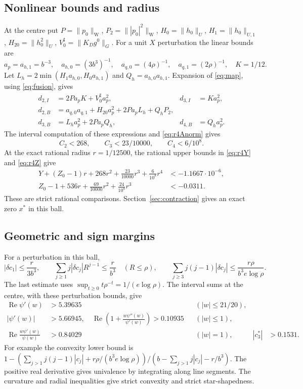 \documentclass[11pt]{amsart}
\theoremstyle{remark}
\numberwithin{equation}{section}
\newcommand{\re}{\operatorname{Re}}
\newcommand{\norm}[1]{\lVert#1\rVert}
\begin{document}
\subsection{Nonlinear bounds and radius}
At the centre put
$P=\norm{p_0}_{\mathrm W}$, $P_2=\norm{|p_0|^2}_{\mathrm W}$,
$H_0=\norm{h_0}_U$, $H_1=\norm{h_0}_{U,1}$,
$H_{20}=\norm{h_0^2}_U$, $V_0^\sharp=\norm{K_Dg^0}_G$.
For a unit $X$ perturbation the linear bounds are
\[
 a_p=a_{h,1}=b^{-3},\quad a_{h,0}=(3b^3)^{-1},\quad
 a_{q,0}=(4\rho)^{-1},\quad a_{q,1}=(2\rho)^{-1},\quad K=1/12.
\]
Let $L_h=2\min(H_1a_{h,0},H_0a_{h,1})$ and
$Q_h=a_{h,0}a_{h,1}$. Expansion of \eqref{eq:map}, using
\eqref{eq:fusion}, gives
\begin{align*}
 d_{2,I}&=2Pa_pK+V_0^\sharp a_p^2,&d_{3,I}&=Ka_p^2,\\
 d_{2,B}&=a_{q,0}a_{q,1}+H_{20}a_p^2+2Pa_pL_h+Q_hP_2,\\
 d_{3,B}&=L_ha_p^2+2Pa_pQ_h,&d_{4,B}&=Q_ha_p^2.
\end{align*}
The interval computation of these expressions and \eqref{eq:r4Anorm}
gives
\[
 C_2<268,\qquad C_3<23/10000,\qquad C_4<6/10^8.
\]
At the exact rational radius $r=1/12500$, the rational upper bounds in
\eqref{eq:r4Y} and \eqref{eq:r4Z} give
\begin{align}
 Y+(Z_0-1)r+268r^2+\frac{23}{10000}r^3+\frac6{10^8}r^4
     &<-1.1667\cdot10^{-6},\label{eq:r4poly}\\
 Z_0-1+536r+\frac{69}{10000}r^2+\frac{24}{10^8}r^3
     &<-0.0311.\label{eq:r4lip}
\end{align}
These are strict rational comparisons. Section~\ref{sec:contraction}
gives an exact zero $x^*$ in this ball.

\subsection{Geometric and sign margins}
For a perturbation in this ball,
\[
 |\delta c_1|\le\frac r{3b^3},\qquad
 \sum_{j\ge1}j|\delta c_j|R^{j-1}\le\frac r{b^3}
 \quad(R\le\rho),\qquad
 \sum_{j\ge3}j(j-1)|\delta c_j|
 \le\frac{r\rho}{b^3e\log\rho}.
\]
The last estimate uses $\sup_{t\ge0}t\rho^{-t}=1/(e\log\rho)$.
The interval sums at the centre, with these perturbation bounds, give
\begin{align}
 \re\psi'(w)&>5.39635 &&(|w|\le21/20),\label{eq:r4geom1}\\
 |\psi'(w)|&>5.66945,\quad
 \re\left(1+\frac{w\psi''(w)}{\psi'(w)}\right)>0.10935
                                      &&(|w|\le1),\label{eq:r4geom2}\\
 \re\frac{w\psi'(w)}{\psi(w)}&>0.84029 &&(|w|=1),&
 |c_3^*|&>0.1531.\label{eq:r4geom3}
\end{align}
For example the convexity lower bound is
$1-(\sum_{j>1}j(j-1)|c_j|+r\rho/(b^3e\log\rho))/
(b-\sum_{j>1}j|c_j|-r/b^3)$.
The positive real derivative gives univalence by integrating along
line segments. The curvature and radial inequalities give strict
convexity and strict star-shapedness.
\end{document}
